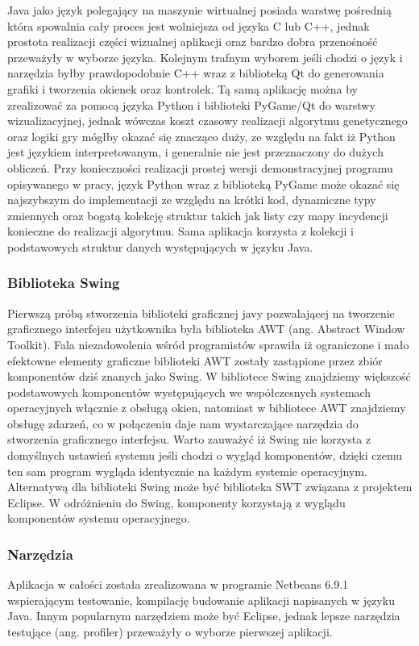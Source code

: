 \begin{par}
	Java jako język polegający na maszynie wirtualnej posiada warstwę pośrednią która spowalnia cały proces jest wolniejsza od języka C lub C++, jednak prostota realizacji części wizualnej aplikacji oraz bardzo dobra przenośność przeważyły w wyborze języka.
	Kolejnym trafnym wyborem jeśli chodzi o język i narzędzia byłby prawdopodobnie C++ wraz z biblioteką Qt do generowania grafiki i tworzenia okienek oraz kontrolek.
	Tą samą aplikację można by zrealizować za pomocą języka Python i biblioteki PyGame/Qt do warstwy wizualizacyjnej, jednak wówczas koszt czasowy realizacji algorytmu genetycznego oraz logiki gry mógłby okazać się znacząco duży, ze względu na fakt iż Python jest językiem interpretowanym, i generalnie nie jest przeznaczony do dużych obliczeń.
	Przy konieczności realizacji prostej wersji demonstracyjnej programu opisywanego w pracy, język Python wraz z biblioteką PyGame może okazać się najszybszym do implementacji ze względu na krótki kod, dynamiczne typy zmiennych oraz bogatą kolekcję struktur takich jak listy czy mapy incydencji konieczne do realizacji algorytmu.
	Sama aplikacja korzysta z kolekcji i podstawowych struktur danych występujących w języku Java.
	\subsubsection{Biblioteka Swing}
	Pierwszą próbą stworzenia biblioteki graficznej javy pozwalającej na tworzenie graficznego interfejsu użytkownika była biblioteka AWT (ang. Abstract Window Toolkit).
	Fala niezadowolenia wśród programistów sprawiła iż ograniczone i mało efektowne elementy graficzne biblioteki AWT zostały zastąpione przez zbiór komponentów dziś znanych jako Swing.
	W bibliotece Swing znajdziemy większość podstawowych komponentów występujących we współczesnych systemach operacyjnych włącznie z obsługą okien, natomiast w bibliotece AWT znajdziemy obsługę zdarzeń, co w połączeniu daje nam wystarczające narzędzia do stworzenia graficznego interfejsu.
	Warto zauważyć iż Swing nie korzysta z domyślnych ustawień systemu jeśli chodzi o wygląd komponentów, dzięki czemu ten sam program wygląda identycznie na każdym systemie operacyjnym.
	Alternatywą dla biblioteki Swing może być biblioteka SWT związana z projektem Eclipse.
	W odróżnieniu do Swing, komponenty korzystają z wyglądu komponentów systemu operacyjnego.
	\subsubsection{Narzędzia}
	Aplikacja w całości została zrealizowana w programie Netbeans 6.9.1 wspierającym testowanie, kompilację budowanie aplikacji napisanych w języku Java.
	Innym popularnym narzędziem może być Eclipse, jednak lepsze narzędzia testujące (ang. profiler) przeważyły o wyborze pierwszej aplikacji.
\end{par}
